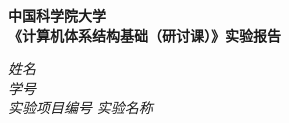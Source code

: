 \begin{center}
  \LARGE \bf 中国科学院大学 \\《计算机体系结构基础（研讨课）》实验报告
\end{center}

\begin{center}
  \emph{姓名} \underline{\makebox[10em][c]{\name}} \\
  \emph{学号} \underline{\makebox[30em][c]{\studentNum}}\\
  \emph{实验项目编号} \underline{\makebox[3em][c]{\labNum}}
  \emph{实验名称} \underline{\makebox[30em][c]{\labName}}\\
\end{center}




  